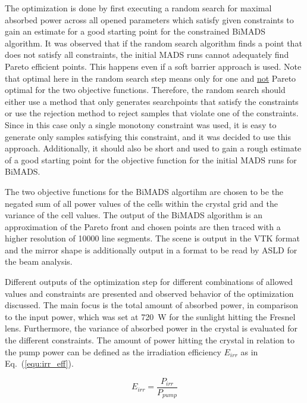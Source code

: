 \documentclass[a4paper,10pt]{article}
\newcommand{\equref}[1]{Eq.~(\ref{#1})}
\begin{document}
    The optimization is done by first executing a random search
    for maximal absorbed power across all opened parameters 
    which satisfy given constraints to gain
    an estimate for a good starting point for the 
    constrained BiMADS algorithm.
    It was observed that if the random search algorithm
    finds a point that does not satisfy all constraints, the initial MADS
    runs cannot adequately find Pareto efficient points.
    This happens even if a soft barrier approach is used.
    Note that optimal here in the random search step means only for one
    and \underline{not} Pareto optimal for the two objective functions.
    Therefore, the random search should either use a method that only
    generates searchpoints that satisfy the constraints or use the
    rejection method to reject samples that violate one of the
    constraints.
    Since in this case only a single monotony constraint was used,
    it is easy to generate only samples satisfying this constraint,
    and it was decided to use this approach.
    Additionally, it should also be short and used to
    gain a rough estimate of a good starting point for the objective
    function for the initial MADS runs for BiMADS.

    The two objective functions for the BiMADS algortihm are chosen
    to be the negated sum of all power values of the cells within the
    crystal grid and the variance of the cell values.
    The output of the BiMADS algorithm is an approximation 
    of the Pareto front and chosen points are then traced with
    a higher resolution of 10000 line segments.
    The scene is output in the VTK format
    and the mirror shape is additionally output in a format to 
    be read by ASLD for the beam analysis.

    Different outputs of the optimization step for different 
    combinations of allowed values and constraints are presented and
    observed behavior of the optimization discussed.
    The main focus is the total amount of absorbed power, in
    comparison to the input power, which was set at \SI{720}{W}
    for the sunlight hitting the Fresnel lens.
    Furthermore, the variance of absorbed power in the crystal
    is evaluated for the different constraints.
    The amount of power hitting the crystal in relation to the
    pump power can be defined as the irradiation efficiency
    $E_{irr}$ as in \equref{equ:irr_eff}.

    \begin{equation}
        \label{equ:irr_eff}
        E_{irr} = \frac{P_{irr}}{P_{pump}}
    \end{equation}
\end{document}
